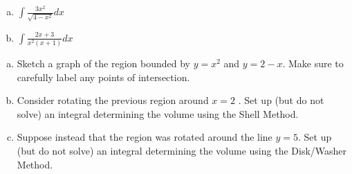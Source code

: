\documentclass[11pt]{exam}
\theoremstyle{definition}
\begin{document}
\begin{questions}
\begin{enumerate}[(a)]
\item $\int \frac{3x^2}{\sqrt{4-x^2}}dx$
\vspace{4in}
\item $\int \frac{2x+3}{x^2(x+1)}dx$
\end{enumerate}

\newpage
\question[10]\mbox{} 

\begin{enumerate}[(a)]
\item Sketch a graph of the region bounded by $y=x^2$ and $y=2-x$.  Make sure to carefully label any points of intersection.
\vspace{2in}
\item Consider rotating the previous region around $x=2$ . Set up (but do not solve) an integral determining the volume using the Shell Method.
\vspace{3in}
\item Suppose instead that the region was rotated around the line $y=5$.  Set up (but do not solve) an integral determining the volume using the Disk/Washer Method.
\end{enumerate}

\end{questions}
\end{document}
